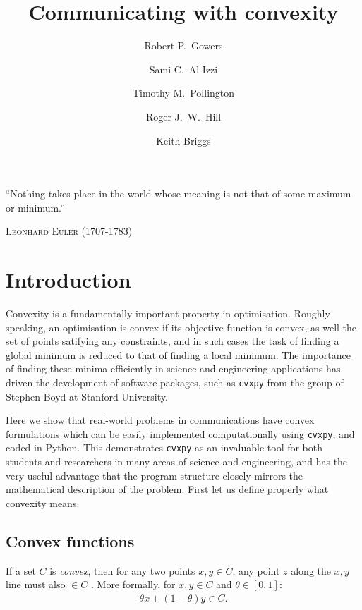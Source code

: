 \documentclass[twocolumn,secnumarabic,amssymb, nobibnotes, aps, prl,superscriptaddress]{revtex4-1}
\newcommand{\NewsItem}[1]{%
		\large #1 \vspace{4pt}
		\par \normalsize \normalfont}
\newcommand{\NewsAuthor}[1]{%
			\hfill \textsc{#1} \vspace{4pt}
			\par \normalfont}
\begin{document}

\title{Communicating with convexity}
\author{Robert P.~Gowers}%
\author{Sami C.~Al-Izzi}%
\author{Timothy M.~Pollington}%
\author{Roger J.~W.~Hill}%
\author{Keith Briggs}
\maketitle


	\NewsItem{\noindent``Nothing takes place in the world whose meaning is not that of some maximum or minimum.''}
	\NewsAuthor{Leonhard Euler (1707-1783)}
    
\section{Introduction}
\noindent Convexity is a fundamentally important property in optimisation. Roughly speaking, an optimisation is convex if its objective function is convex, as well the set of points satifying any constraints, and in such cases the task of finding a global minimum is reduced to that of finding a local minimum. The importance of finding these minima efficiently in science and engineering applications has driven the development of software packages, such as \texttt{cvxpy} from the group of Stephen Boyd at Stanford University.

Here we show that real-world problems in communications have convex formulations which can be easily implemented computationally using \texttt{cvxpy}, and coded in Python. This demonstrates \texttt{cvxpy} as an invaluable tool for both students and researchers in many areas of science and engineering, and has the very useful advantage that the program structure closely mirrors the mathematical description of the problem. First let us define properly what convexity means.

\subsection{Convex functions}
\noindent{}If a set $C$ is \textit{convex}, then for any two points $x,y\in C$, any point $z$ along the $x,y$ line must also $\in C$ \cite[p.23]{cvxpybook}. More formally, for $x,y\in C$ and $\theta\in [0,1]$:
\begin{align}
\theta x + (1-\theta)y\in C.
\end{align}
\end{document}
